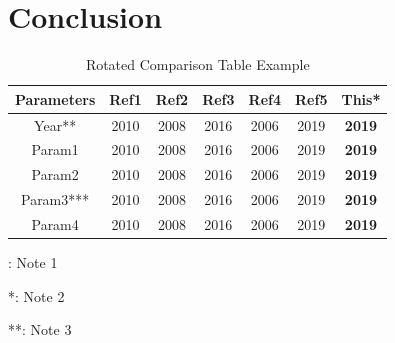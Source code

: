 \setlength{\parskip}{\baselineskip}

\section{Conclusion}\label{sec_conc}

\begin{table}
\begin{center}
\begin{threeparttable}
\caption{Rotated Comparison Table Example}
\label{tabel_comprotated}
\centering
\begin{tabular}{c || c | c | c | c | c | c}
\hline\hline
Parameters  & Ref1  & Ref2  & Ref3  & Ref4  & Ref5  & \textbf{This*}\\
\hline\hline
Year**      & 2010  & 2008  & 2016  & 2006  & 2019  & \textbf{2019} \\
\hline
Param1      & 2010  & 2008  & 2016  & 2006  & 2019  & \textbf{2019} \\
\hline
Param2      & 2010  & 2008  & 2016  & 2006  & 2019  & \textbf{2019} \\
\hline
Param3***   & 2010  & 2008  & 2016  & 2006  & 2019  & \textbf{2019} \\
\hline
Param4      & 2010  & 2008  & 2016  & 2006  & 2019  & \textbf{2019} \\
\hline\hline
\end{tabular}
	\begin{tablenotes}
		\small
		\centering
		\item *: Note 1
		\item **: Note 2
		\item ***: Note 3
	\end{tablenotes}
\end{threeparttable}
\end{center}
\end{table}
